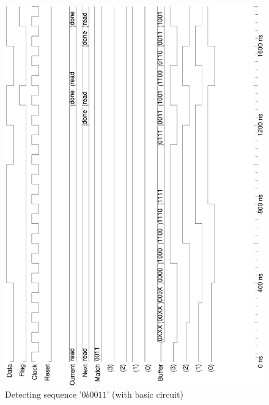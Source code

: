 \documentclass[10pt,a4paper]{report}
\begin{document}
\begin{figure}
\includegraphics[scale=0.49,angle=-90]{graphs/seq_test1.BASIC.ps}
\caption{\small{Detecting sequence '$0b0011$' (with basic circuit)}} \label{wave:usd:t1w2}
\end{figure}
\end{document}
